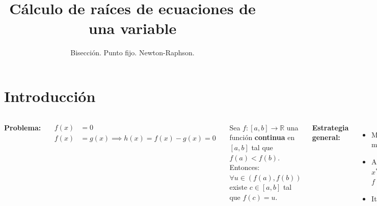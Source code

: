 \documentclass[9pt, aspectratio=169]{beamer}
\title{Cálculo de raíces de ecuaciones de una variable}
\subtitle{Bisección. Punto fijo. Newton-Raphson.}
\begin{document}
\maketitle

\section{Introducción}

\begin{frame}
\begin{columns}[t]
\cx
\textbf{Problema:}

\begin{equation*}
    \begin{split}
        f(x) &= 0 \\
        f(x) &= g(x) \implies h(x) = f(x) - g(x) = 0
    \end{split} 
\end{equation*}

\begin{theorem}
Sea $f: [a, b] \rightarrow \mathbb{R}$ una función \textbf{continua} en $[a, b]$ tal que $f(a) < f(b)$. Entonces: $\forall u \in (f(a), f(b))$ existe $c \in [a, b]$ tal que $f(c) = u$.
\end{theorem}
\pause

\textbf{Estrategia general:} %
\begin{itemize}
    \item Mostrar que existe al menos una solución ($x^*$)
    \item Aislar una raíz: $D \subset \mathbb{R}$, $x^* \in D$ y $f(x) \neq 0 \; \forall x \in D \setminus \{ x^* \}$
    \item Iterar
\end{itemize}
\pause


\end{columns}
\end{frame}
\end{document}

